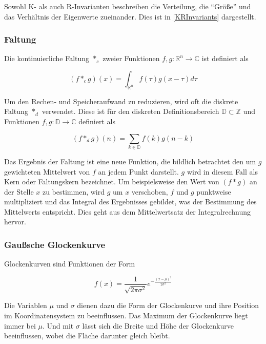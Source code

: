 \documentclass[a4paper,fontsize=12pt,toc=bib,halfparskip,ngerman]{scrartcl}
\begin{document}
Sowohl K- als auch R-Invarianten beschreiben die Verteilung, die ``Gr\"o{\ss}e'' und das Verh\"altnis der Eigenwerte zueinander. Dies ist in \cref{KRInvariants} dargestellt. 

\subsubsection{Faltung}
Die kontinuierliche Faltung $*_c$ zweier Funktionen $f,g:\mathbb{R}^n\rightarrow\mathbb{C}$ ist definiert als

\begin{equation}
(f*_cg)(x) = \int_{\mathbb{R}^n} f(\tau)g(x-\tau)d\tau
\end{equation}

Um den Rechen- und Speicheraufwand zu reduzieren, wird oft die diskrete Faltung $*_d$ verwendet. Diese ist f\"ur den diskreten Definitionsbereich $\mathbb{D} \subset \mathbb{Z}$ und Funktionen $f,g:\mathbb{D}\rightarrow\mathbb{C}$ definiert als

\begin{equation}
(f*_dg)(n) = \sum_{k\in\mathbb{D}}f(k)g(n-k)
\end{equation}

Das Ergebnis der Faltung ist eine neue Funktion, die bildlich betrachtet den um $g$ gewichteten Mittelwert von $f$ an jedem Punkt darstellt. $g$ wird in diesem Fall als Kern oder Faltungskern bezeichnet. Um beispielsweise den Wert von $(f*g)$ an der Stelle $x$ zu bestimmen, wird $g$ um $x$ verschoben, $f$ und $g$ punktweise multipliziert und das Integral des Ergebnisses gebildet, was der Bestimmung des Mittelwerts entspricht. Dies geht aus dem Mittelwertsatz der Integralrechnung hervor.

\subsubsection{Gau{\ss}sche Glockenkurve}
Glockenkurven sind Funktionen der Form 

\begin{equation}
f(x) = \frac{1}{\sqrt{2\pi \sigma^2}}e^{-\frac{(x-\mu)^2}{2\sigma^2}}
\end{equation}

Die Variablen $\mu$ und $\sigma$ dienen dazu die Form der Glockenkurve und ihre Position im Koordinatensystem zu beeinflussen. Das Maximum der Glockenkurve liegt immer bei $\mu$. Und mit $\sigma$ l\"asst sich die Breite und H\"ohe der Glockenkurve beeinflussen, wobei die Fl\"ache darunter gleich bleibt.
\end{document}
